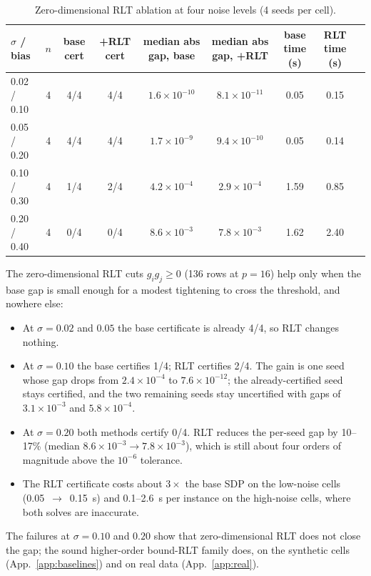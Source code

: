 \begin{table}[t]
\centering
\caption{Zero-dimensional RLT ablation at four noise levels (4 seeds per cell).}
\label{tab:app_rlt}
\scriptsize
\setlength{\tabcolsep}{2pt}
\begin{tabular}{@{}lcccccccc@{}}
\toprule
$\sigma$ / bias & $n$ & base cert & +RLT cert & median abs gap, base & median abs gap, +RLT & base time (s) & RLT time (s) \\
\midrule
0.02 / 0.10 & 4 & 4/4 & 4/4 & $1.6\times10^{-10}$ & $8.1\times10^{-11}$ & 0.05 & 0.15 \\
0.05 / 0.20 & 4 & 4/4 & 4/4 & $1.7\times10^{-9}$ & $9.4\times10^{-10}$ & 0.05 & 0.14 \\
0.10 / 0.30 & 4 & 1/4 & 2/4 & $4.2\times10^{-4}$ & $2.9\times10^{-4}$ & 1.59 & 0.85 \\
0.20 / 0.40 & 4 & 0/4 & 0/4 & $8.6\times10^{-3}$ & $7.8\times10^{-3}$ & 1.62 & 2.40 \\
\bottomrule
\end{tabular}

\end{table}

The zero-dimensional RLT cuts $g_ig_j\ge0$ (136 rows at $p=16$) help only when the base gap is small enough for a modest tightening to cross the threshold, and nowhere else:
\begin{itemize}
\item At $\sigma=0.02$ and $0.05$ the base certificate is already 4/4, so RLT changes nothing.
\item At $\sigma=0.10$ the base certifies 1/4; RLT certifies 2/4. The gain is one seed whose gap drops from $2.4\times10^{-4}$ to $7.6\times10^{-12}$; the already-certified seed stays certified, and the two remaining seeds stay uncertified with gaps of $3.1\times10^{-3}$ and $5.8\times10^{-4}$.
\item At $\sigma=0.20$ both methods certify 0/4. RLT reduces the per-seed gap by 10--17\% (median $8.6\times10^{-3}\to7.8\times10^{-3}$), which is still about four orders of magnitude above the $10^{-6}$ tolerance.
\item The RLT certificate costs about $3\times$ the base SDP on the low-noise cells (0.05~$\to$~0.15~s) and 0.1--2.6~s per instance on the high-noise cells, where both solves are inaccurate.
\end{itemize}
The failures at $\sigma=0.10$ and $0.20$ show that zero-dimensional RLT does not close the gap; the sound higher-order bound-RLT family does, on the synthetic cells (App.~\ref{app:baselines}) and on real data (App.~\ref{app:real}).

